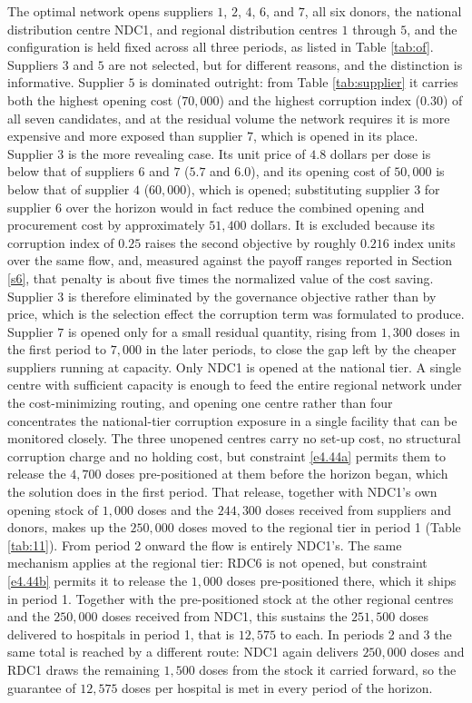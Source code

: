 \documentclass[a4paper]{elsarticle}
\begin{document}
{The optimal network opens suppliers $1$, $2$, $4$, $6$, and $7$, all six donors, the national distribution centre NDC1, and regional distribution centres $1$ through $5$, and the configuration is held fixed across all three periods, as listed in Table \ref{tab:of}. Suppliers $3$ and $5$ are not selected, but for different reasons, and the distinction is informative. Supplier $5$ is dominated outright: from Table \ref{tab:supplier} it carries both the highest opening cost ($70,000$) and the highest corruption index ($0.30$) of all seven candidates, and at the residual volume the network requires it is more expensive and more exposed than supplier $7$, which is opened in its place. Supplier $3$ is the more revealing case. Its unit price of $4.8$ dollars per dose is below that of suppliers $6$ and $7$ ($5.7$ and $6.0$), and its opening cost of $50,000$ is below that of supplier $4$ ($60,000$), which is opened; substituting supplier $3$ for supplier $6$ over the horizon would in fact reduce the combined opening and procurement cost by approximately $51,400$ dollars. It is excluded because its corruption index of $0.25$ raises the second objective by roughly $0.216$ index units over the same flow, and, measured against the payoff ranges reported in Section \ref{s6}, that penalty is about five times the normalized value of the cost saving. Supplier $3$ is therefore eliminated by the governance objective rather than by price, which is the selection effect the corruption term was formulated to produce. Supplier $7$ is opened only for a small residual quantity, rising from $1,300$ doses in the first period to $7,000$ in the later periods, to close the gap left by the cheaper suppliers running at capacity. Only NDC1 is opened at the national tier. A single centre with sufficient capacity is enough to feed the entire regional network under the cost-minimizing routing, and opening one centre rather than four concentrates the national-tier corruption exposure in a single facility that can be monitored closely. The three unopened centres carry no set-up cost, no structural corruption charge and no holding cost, but constraint \ref{e4.44a} permits them to release the $4,700$ doses pre-positioned at them before the horizon began, which the solution does in the first period. That release, together with NDC1's own opening stock of $1,000$ doses and the $244,300$ doses received from suppliers and donors, makes up the $250,000$ doses moved to the regional tier in period 1 (Table \ref{tab:11}). From period 2 onward the flow is entirely NDC1's. The same mechanism applies at the regional tier: RDC6 is not opened, but constraint \ref{e4.44b} permits it to release the $1,000$ doses pre-positioned there, which it ships in period 1. Together with the pre-positioned stock at the other regional centres and the $250,000$ doses received from NDC1, this sustains the $251,500$ doses delivered to hospitals in period 1, that is $12,575$ to each. In periods 2 and 3 the same total is reached by a different route: NDC1 again delivers $250,000$ doses and RDC1 draws the remaining $1,500$ doses from the stock it carried forward, so the guarantee of $12,575$ doses per hospital is met in every period of the horizon.\\
}
\end{document}
